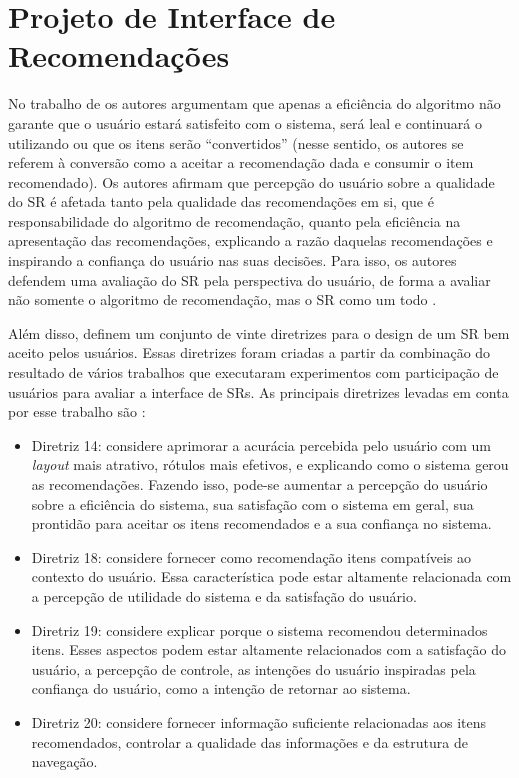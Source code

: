 \section{Projeto de Interface de Recomendações}\label{section:fundamentacao-apresentacao-recomendacao}

No trabalho de  os autores argumentam que apenas a eficiência do algoritmo não garante
que o usuário estará satisfeito com o sistema, será leal e continuará o utilizando ou que os itens serão ``convertidos''
(nesse sentido, os autores se referem à conversão como a aceitar a recomendação dada e consumir o item recomendado).
Os autores afirmam que percepção do usuário sobre a qualidade do SR é afetada tanto pela
qualidade das recomendações em si, que é responsabilidade do algoritmo de recomendação, quanto pela eficiência na apresentação
das recomendações, explicando a razão daquelas recomendações e inspirando a confiança do usuário nas suas decisões.
Para isso, os autores defendem uma avaliação do SR pela perspectiva do usuário, de forma a avaliar não somente o algoritmo de
recomendação, mas o SR como um todo \cite{pu2012evaluating}.

Além disso,  definem um conjunto de vinte diretrizes para o design de um SR bem aceito
pelos usuários. Essas diretrizes foram criadas a partir da combinação do resultado de vários trabalhos que executaram
experimentos com participação de usuários para avaliar a interface de SRs. As principais
diretrizes levadas em conta por esse trabalho são \cite{pu2012evaluating}:

\begin{itemize}
\item Diretriz 14: considere aprimorar a acurácia percebida pelo usuário com um \textit{layout} mais atrativo, rótulos mais
efetivos, e explicando como o sistema gerou as recomendações. Fazendo isso, pode-se aumentar a percepção do usuário sobre a
eficiência do sistema, sua satisfação com o sistema em geral, sua prontidão para aceitar os itens recomendados e a sua
confiança no sistema.
\item Diretriz 18: considere fornecer como recomendação itens compatíveis ao contexto do usuário. Essa característica
pode estar altamente relacionada com a percepção de utilidade do sistema e da satisfação do usuário.
\item Diretriz 19: considere explicar porque o sistema recomendou determinados itens. Esses aspectos podem estar
altamente relacionados com a satisfação do usuário, a percepção de controle, as intenções do usuário inspiradas pela
confiança do usuário, como a intenção de retornar ao sistema.
\item Diretriz 20: considere fornecer informação suficiente relacionadas aos itens recomendados, controlar a qualidade
das informações e da estrutura de navegação.
\end{itemize}

